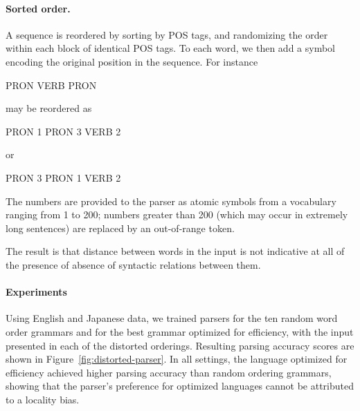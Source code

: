 \documentclass[10pt,twoside,lineno]{article}
\begin{document}
\paragraph{Sorted order.} A sequence is reordered by sorting by POS tags, and randomizing the order within each block of identical POS tags.
To each word, we then add a symbol encoding the original position in the sequence.
For instance
\begin{center}
PRON VERB PRON
\end{center}
may be reordered as
\begin{center}
PRON 1 PRON 3 VERB 2
\end{center}
or
\begin{center}
PRON 3 PRON 1 VERB 2
\end{center}
The numbers are provided to the parser as atomic symbols from a vocabulary ranging from 1 to 200; numbers greater than 200 (which may occur in extremely long sentences) are replaced by an out-of-range token.

The result is that distance between words in the input is not indicative at all of the presence of absence of syntactic relations between them.

\paragraph{Experiments}
Using English and Japanese data, we trained parsers for the ten random word order grammars and for the best grammar optimized for efficiency, with the input presented in each of the distorted orderings.
Resulting parsing accuracy scores are shown in Figure~\ref{fig:distorted-parser}.
In all settings, the language optimized for efficiency achieved higher parsing accuracy than random ordering grammars, showing that the parser's preference for optimized languages cannot be attributed to a locality bias.
\end{document}
